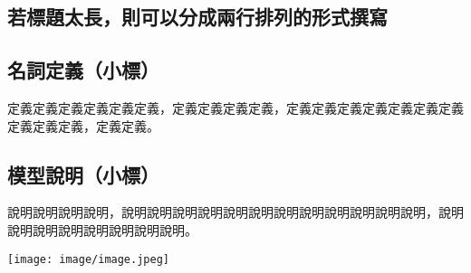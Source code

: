 \begin{ZhChapter}

\chapter{若標題太長，則可以分成兩行排列的形式撰寫}

\section{名詞定義（小標）}

定義定義定義定義定義定義\cite{112TIT00392032}，定義定義定義定義，定義定義定義定義定義定義定義定義定義定義，定義定義。

\begin{table*}[htbp]
    \centering
    \caption{表格範例標題} \label{tab: complexity}
\end {table*}

\section{模型說明（小標）}

說明說明說明說明，說明說明說明說明說明說明說明說明說明說明說明說明，說明說明說明說明說明說明說明說明。

\begin{figure*}[htbp]
    \centering
    \texttt{[image: image/image.jpeg]}
    \caption{Cool train station}
    \label{fig: image}
\end{figure*}

\end{ZhChapter}